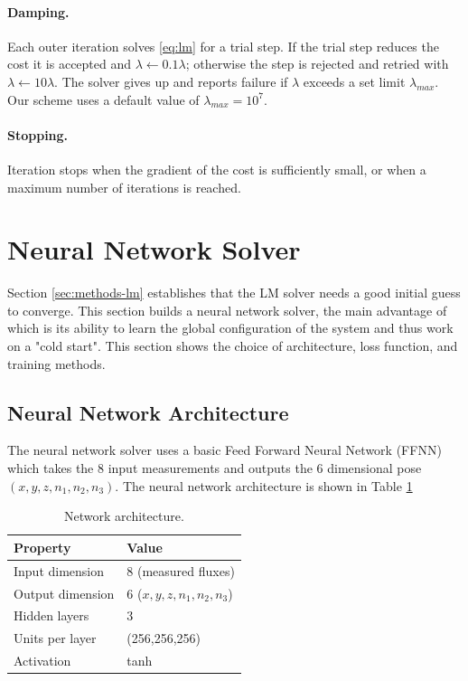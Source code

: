 \documentclass[12pt,a4paper]{report}
\begin{document}
\paragraph{Damping.} Each outer iteration solves \ref{eq:lm} for a trial step. If the trial step reduces the cost it is accepted and $\lambda \leftarrow 0.1\lambda$; otherwise the step is rejected and retried with $\lambda \leftarrow 10\lambda$. The solver gives up and reports failure if $\lambda$ exceeds a set limit $\lambda_{max}$. Our scheme uses a default value of $\lambda_{max} = 10^7$.

\paragraph{Stopping.} Iteration stops when the gradient of the cost is sufficiently small, or when a maximum number of iterations is reached.

\section{Neural Network Solver}\label{sec:network}
Section \ref{sec:methods-lm} establishes that the LM solver needs a good initial guess to converge. This section builds a neural network solver, the main advantage of which is its ability to learn the global configuration of the system and thus work on a "cold start". This section shows the choice of architecture, loss function, and training methods.
\subsection{Neural Network Architecture}
The neural network solver uses a basic Feed Forward Neural Network (FFNN) which takes the 8 input measurements and outputs the 6 dimensional pose $(x,y,z,n_1,n_2,n_3)$. The neural network architecture is shown in Table \ref{tab:architecture} 

\begin{table}
  \centering
  \begin{tabular}{ll}
    \toprule
    Property & Value \\
    \midrule
    Input dimension       & 8 (measured fluxes) \\
    Output dimension      & 6 ($x, y, z, n_1, n_2, n_3$) \\
    Hidden layers         & 3 \\
    Units per layer       & (256,256,256) \\
    Activation            & tanh \\
    \bottomrule
  \end{tabular}
  \caption{Network architecture.}
  \label{tab:architecture}
\end{table}
\end{document}
